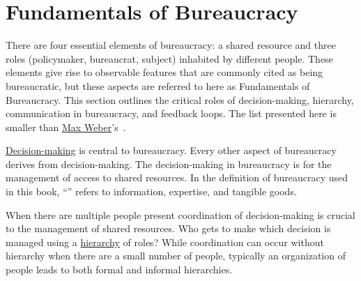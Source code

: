 \section{Fundamentals of Bureaucracy\label{sec:fundamentals-of-b}}

There are four essential elements of bureaucracy: a shared resource and three roles (policymaker, bureaucrat, subject) inhabited by different people. 
These elements give rise to observable features that are commonly cited as being bureaucratic, but these aspects are referred to here as Fundamentals of Bureaucracy.
This section outlines the critical roles of decision-making, hierarchy, communication in bureaucracy, and feedback loops. 
The list presented here is smaller than \href{https://en.wikipedia.org/wiki/Bureaucracy\%23Max_Weber}{Max Weber}'s~\cite{2015_Weber}.

\hyperref[sec:decision-making]{Decision-making}
%
is central to bureaucracy. Every other aspect of bureaucracy derives from decision-making. 
The decision-making in bureaucracy is for the management of access to shared resources. In the definition of bureaucracy used in this book, ``\iftoggle{glossarysubstitutionworks}{\glspl{shared resource}}{shared resources}'' 
\iftoggle{glossaryinmargin}{\marginpar{[Glossary]}}{}%
refers to information, expertise, and tangible goods. %

When there are multiple people present 
coordination of decision-making is crucial to the management of shared resources. Who gets to make which decision is managed using a
\hyperref[sec:hierarchy-of-roles]{hierarchy} of roles?
%
While coordination can occur without hierarchy when there are a small number of people, typically an organization of people leads to both formal and informal hierarchies. 

